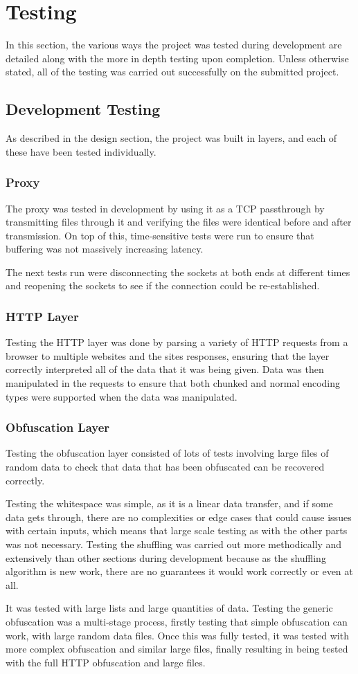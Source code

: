 \def\listingsfont{\ttfamily}
\section{Testing}
In this section, the various ways the project was tested during development are detailed along with the more in depth testing upon completion. Unless otherwise stated, all of the testing was carried out successfully on the submitted project.
\subsection{Development Testing}
As described in the design section, the project was built in layers, and each of these have been tested individually.
\subsubsection*{Proxy}
The proxy was tested in development by using it as a TCP passthrough by transmitting files through it and verifying the files were identical before and after transmission.
On top of this, time-sensitive tests were run to ensure that buffering was not massively increasing latency.\par
The next tests run were disconnecting the sockets at both ends at different times and reopening the sockets to see if the connection could be re-established.\par
\subsubsection*{HTTP Layer}
Testing the HTTP layer was done by parsing a variety of HTTP requests from a browser to multiple websites and the sites responses, ensuring that the layer correctly interpreted all of the data that it was being given.
Data was then manipulated in the requests to ensure that both chunked and normal encoding types were supported when the data was manipulated.
\subsubsection*{Obfuscation Layer}
Testing the obfuscation layer consisted of lots of tests involving large files of random data to check that data that has been obfuscated can be recovered correctly.\par
Testing the whitespace was simple, as it is a linear data transfer, and if some data gets through, there are no complexities or edge cases that could cause issues with certain inputs, which means that large scale testing as with the other parts was not necessary.
Testing the shuffling was carried out more methodically and extensively than other sections during development because as the shuffling algorithm is new work, there are no guarantees it would work correctly or even at all.\par It was tested with large lists and large quantities of data.
Testing the generic obfuscation was a multi-stage process, firstly testing that simple obfuscation can work, with large random data files. Once this was fully tested, it was tested with more complex obfuscation and similar large files, finally resulting in being tested with the full HTTP obfuscation and large files.
